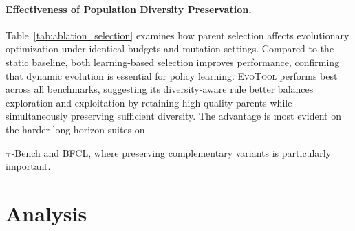\documentclass[11pt]{article}
\begin{document}
\paragraph{Effectiveness of Population Diversity Preservation.} Table~\ref{tab:ablation_selection} examines how parent selection affects evolutionary optimization under identical budgets and mutation settings. Compared to the static baseline, both learning-based selection improves performance, confirming that dynamic evolution is essential for policy learning.
\textsc{EvoTool} performs best across all benchmarks, suggesting its diversity-aware rule better balances exploration and exploitation by retaining high-quality parents while simultaneously preserving sufficient diversity. The advantage is most evident on the harder long-horizon suites on {$\bm{\tau}$-Bench and BFCL, where preserving complementary variants is particularly important.








\section{Analysis}

}
\end{document}
